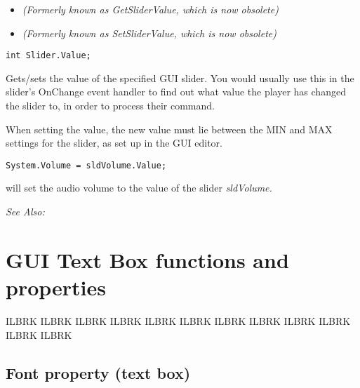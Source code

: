 \begin{itemize}
\item \it{(Formerly known as GetSliderValue, which is now obsolete)}
\item \it{(Formerly known as SetSliderValue, which is now obsolete)}
\end{itemize}

\begin{verbatim}
int Slider.Value;
\end{verbatim}
Gets/sets the value of the specified GUI slider. You would usually
use this in the slider's OnChange event handler to find out what value the
player has changed the slider to, in order to process their command.

When setting the value, the new value must lie between the MIN and MAX settings
for the slider, as set up in the GUI editor.

\begin{verbatim}
System.Volume = sldVolume.Value;
\end{verbatim}
will set the audio volume to the value of the slider \it{sldVolume}.

\it{See Also:} 



\section{GUI Text Box functions and properties}%

ILBRK
ILBRK
ILBRK
ILBRK
ILBRK
ILBRK
ILBRK
ILBRK
ILBRK
ILBRK
ILBRK
ILBRK


\subsection{Font property (text box)}\label{TextBox.Font}%

